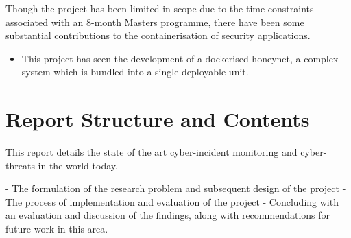 Though the project has been limited in scope due to the time constraints associated with an 8-month Masters programme, there have been some substantial contributions to the containerisation of security applications.
\begin{itemize}
	\item This project has seen the development of a dockerised honeynet, a complex system which is bundled into a single deployable unit.
\end{itemize}

\section{Report Structure and Contents}
This report details the state of the art cyber-incident monitoring and cyber-threats in the world today. 

- The formulation of the research problem and subsequent design of the project
- The process of implementation and evaluation of the project
- Concluding with an evaluation and discussion of the findings, along with recommendations for future work in this area.
